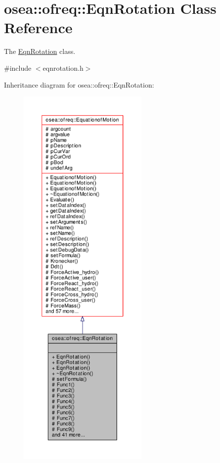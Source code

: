 \hypertarget{classosea_1_1ofreq_1_1_eqn_rotation}{\section{osea\-:\-:ofreq\-:\-:Eqn\-Rotation Class Reference}
\label{classosea_1_1ofreq_1_1_eqn_rotation}
}


The \hyperlink{classosea_1_1ofreq_1_1_eqn_rotation}{Eqn\-Rotation} class.  




{\ttfamily \#include $<$eqnrotation.\-h$>$}



Inheritance diagram for osea\-:\-:ofreq\-:\-:Eqn\-Rotation\-:
\nopagebreak
\begin{figure}[H]
\begin{center}
\leavevmode
\includegraphics[height=550pt]{classosea_1_1ofreq_1_1_eqn_rotation__inherit__graph}
\end{center}
\end{figure}
